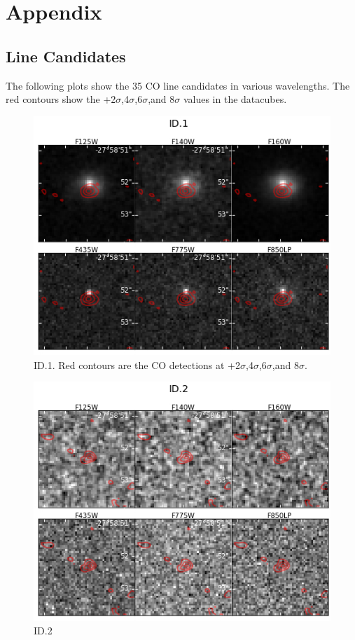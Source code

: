 \chapter{Appendix}

\section{Line Candidates}\label{sec:A1}

The following plots show the 35 CO line candidates in various wavelengths. The red contours show the  +2$\sigma$,4$\sigma$,6$\sigma$,and 8$\sigma$ values in the datacubes. 

\begin{figure}[tbp]
\centering \includegraphics[width=160mm]{Matched/ASPECS_Cutout_0.jpg}
\caption{ID.1. Red contours are the CO detections at +2$\sigma$,4$\sigma$,6$\sigma$,and 8$\sigma$. }
\label{fig:Match_One}
\end{figure}

\begin{figure}[tbp]
\centering \includegraphics[width=160mm]{Matched/ASPECS_Cutout_1.jpg}
\caption{ID.2}
\label{fig:Match_Two}
\end{figure}


